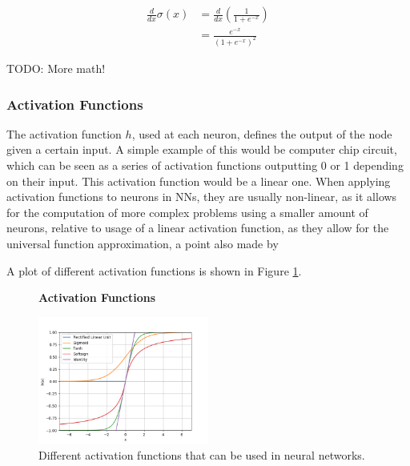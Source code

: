 \begin{align}
\frac{d}{dx}\sigma(x) &= \frac{d}{dx}(\frac{1}{1 + e^{-x}})\\
&= \frac{e^{-x}}{(1+e^{-x})^2}
\end{align}

TODO: More math!


\subsubsection{Activation Functions}
The activation function $h$, used at each neuron, defines the output of the
node given a certain input. A simple example of this would be computer chip
circuit, which can be seen as a series of activation functions outputting 0 or
1 depending on their input. This activation function would be a linear one.
When applying activation functions to neurons in \gls{NN}s, they are usually
non-linear, as it allows for the computation of more complex problems using a
smaller amount of neurons, relative to usage of a linear activation function,
as they allow for the universal function approximation, a point also made by
\cite{6797088}

A plot of different activation functions is shown in Figure
\ref{fig:activation_functions}.

\begin{figure}
    \centering
    \textbf{Activation Functions}\par\medskip
    \includegraphics[width=0.5\textwidth]{./pictures/method/activation_functions.png}
    \caption{Different activation functions that can be used in neural
        networks.}
    \label{fig:activation_functions}
\end{figure}

